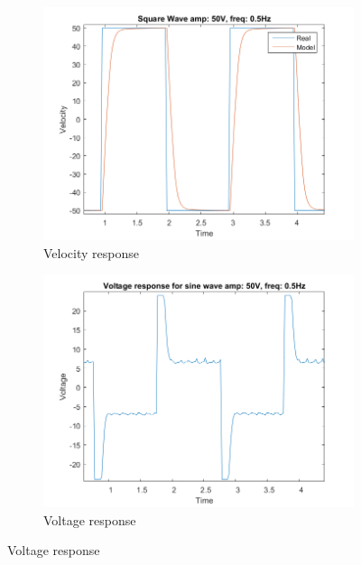 \documentclass[12pt,a4paper]{article}
\begin{document}
\begin{figure}[H]
  \centering
  \begin{subfigure}[b]{0.45\linewidth}
    \includegraphics[width=\linewidth]{T2_a50_f05.png}
    \caption{Velocity response }
    \label{fig:T2_a50_f05.png}
  \end{subfigure}
  \begin{subfigure}[b]{0.45\linewidth}
    \includegraphics[width=\linewidth]{T2_V_a50_f05.png}
    \caption{Voltage response }
    \label{fig:T2_V_a50_f05}
  \end{subfigure}
\end{figure}
\end{document}
